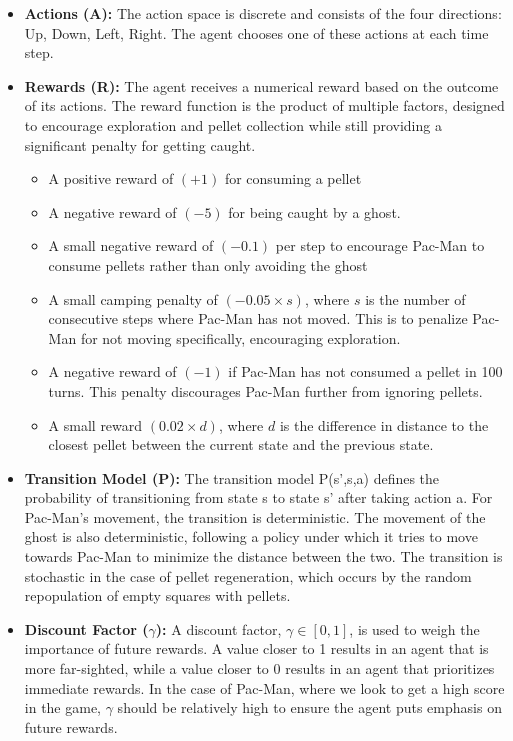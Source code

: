 \documentclass{article}
\begin{document}
\begin{itemize}
\item \textbf{Actions (A):} The action space is discrete and consists of the four  directions: {Up, Down, Left, Right}. The agent chooses one of these actions at each time step.
\item \textbf{Rewards (R):} The agent receives a numerical reward based on the outcome of its actions. The reward function is the product of multiple factors, designed to encourage exploration and pellet collection while still providing a significant penalty for getting caught.
\begin{itemize}
\item A positive reward of $(+1)$ for consuming a pellet
\item A negative reward of $(-5)$ for being caught by a ghost.
\item A small negative reward of $(-0.1)$ per step to encourage Pac-Man to consume pellets rather than only avoiding the ghost
\item A small camping penalty of $(-0.05\times s)$, where $s$ is the number of consecutive steps where Pac-Man has not moved. This is to penalize Pac-Man for not moving specifically, encouraging exploration.
\item A negative reward of $(-1)$ if Pac-Man has not consumed a pellet in 100 turns. This penalty discourages Pac-Man further from ignoring pellets. 
\item A small reward $(0.02\times d)$, where $d$ is the difference in distance to the closest pellet between the current state and the previous state.
\end{itemize}

\item \textbf{Transition Model (P):} The transition model P(s',s,a) defines the probability of transitioning from state s to state s' after taking action a. For Pac-Man's movement, the transition is deterministic. The movement of the ghost is also deterministic, following a policy under which it tries to move towards Pac-Man to minimize the distance between the two. The transition is stochastic in the case of pellet regeneration, which occurs by the random repopulation of empty squares with pellets. 

\item \textbf{Discount Factor ($\gamma$):} A discount factor, $\gamma \in [0,1]$, is used to weigh the importance of future rewards. A value closer to 1 results in an agent that is more far-sighted, while a value closer to 0 results in an agent that prioritizes immediate rewards. In the case of Pac-Man, where we look to get a high score in the game, $\gamma$ should be relatively high to ensure the agent puts emphasis on future rewards. 
\end{itemize}
\end{document}
